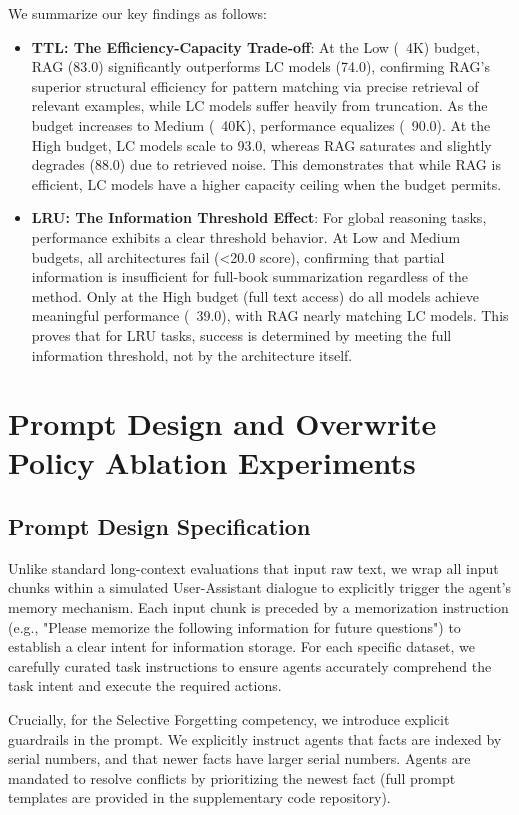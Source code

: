 We summarize our key findings as follows:
\begin{itemize}
    \item \textbf{TTL: The Efficiency-Capacity Trade-off}: At the Low (~4K) budget, RAG (83.0) significantly outperforms LC models (74.0), confirming RAG's superior structural efficiency for pattern matching via precise retrieval of relevant examples, while LC models suffer heavily from truncation. As the budget increases to Medium (~40K), performance equalizes (~90.0). At the High budget, LC models scale to 93.0, whereas RAG saturates and slightly degrades (88.0) due to retrieved noise. This demonstrates that while RAG is efficient, LC models have a higher capacity ceiling when the budget permits.
    \item \textbf{LRU: The Information Threshold Effect}: For global reasoning tasks, performance exhibits a clear threshold behavior. At Low and Medium budgets, all architectures fail (<20.0 score), confirming that partial information is insufficient for full-book summarization regardless of the method. Only at the High budget (full text access) do all models achieve meaningful performance (~39.0), with RAG nearly matching LC models. This proves that for LRU tasks, success is determined by meeting the full information threshold, not by the architecture itself.
\end{itemize}

\section{Prompt Design and Overwrite Policy Ablation Experiments}
\label{app:prompt_design}

\subsection{Prompt Design Specification}
Unlike standard long-context evaluations that input raw text, we wrap all input chunks within a simulated User-Assistant dialogue to explicitly trigger the agent's memory mechanism. Each input chunk is preceded by a memorization instruction (e.g., "Please memorize the following information for future questions") to establish a clear intent for information storage. For each specific dataset, we carefully curated task instructions to ensure agents accurately comprehend the task intent and execute the required actions.

Crucially, for the Selective Forgetting competency, we introduce explicit guardrails in the prompt. We explicitly instruct agents that facts are indexed by serial numbers, and that newer facts have larger serial numbers. Agents are mandated to resolve conflicts by prioritizing the newest fact (full prompt templates are provided in the supplementary code repository).

